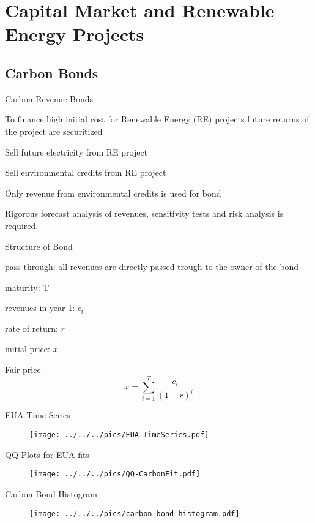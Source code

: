 \section{Capital Market and Renewable Energy Projects}
\subsection{Carbon Bonds}

{Carbon Revenue Bonds}
\item<1-> To finance high initial cost for Renewable Energy (RE) projects future returns of the project are securitized
\item<2->
\item Sell future electricity from RE project
\item Sell environmental credits from RE project
\item<3-> Only revenue from environmental credits is used for bond
\item<4-> Rigorous forecast analysis of revenues, sensitivity tests and risk analysis is required.

{Structure of Bond}
\item<1-> pass-through: all revenues are directly passed trough to the owner of the bond
\item<2->
\item maturity: T
\item revenues in year 1: $c_i$
\item rate of return: $r$
\item initial price: $x$
\item<3-> Fair price
$$
x= \sum_{i=1}^T \frac{c_i}{(1+r)^i}
$$

{EUA Time Series}
\begin{figure}[h!]
\centering
\texttt{[image: ../../../pics/EUA-TimeSeries.pdf]}
\label{fig:EUA-TS}
\end{figure}

{QQ-Plots for EUA fits}
\begin{figure}[h!]
\centering
\texttt{[image: ../../../pics/QQ-CarbonFit.pdf]}
\label{fig:EUA-fits}
\end{figure}

{Carbon Bond Histogram}
\begin{figure}[h!]
\centering
\texttt{[image: ../../../pics/carbon-bond-histogram.pdf]}
\label{fig:Carbon-Bond-Histogram}
\end{figure}

